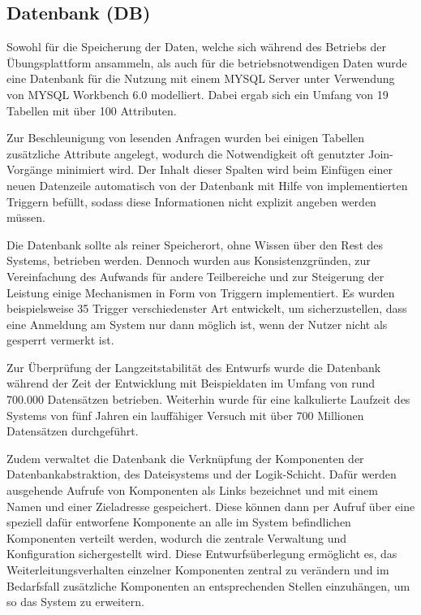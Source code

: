 \documentclass[10pt,a4paper,final,parskip]{scrartcl}
\begin{document}
 

\subsection{Datenbank (DB)}
\parbox{\textwidth}{Sowohl für die Speicherung der Daten, welche sich während des Betriebs der Übungsplattform ansammeln, als auch für die betriebsnotwendigen Daten wurde eine Datenbank für die Nutzung mit einem MYSQL Server unter Verwendung von MYSQL Workbench 6.0 modelliert. Dabei ergab sich ein Umfang von 19 Tabellen mit über 100 Attributen. }

\parbox{\textwidth}{Zur Beschleunigung von lesenden Anfragen wurden bei einigen Tabellen zusätzliche Attribute angelegt, wodurch die Notwendigkeit oft genutzter Join-Vorgänge minimiert wird. Der Inhalt dieser Spalten wird beim Einfügen einer neuen Datenzeile automatisch von der Datenbank mit Hilfe von implementierten Triggern befüllt, sodass diese Informationen nicht explizit angeben werden müssen.} 

\parbox{\textwidth}{Die Datenbank sollte als reiner Speicherort, ohne Wissen über den Rest des Systems, betrieben werden. Dennoch wurden aus Konsistenzgründen, zur Vereinfachung des Aufwands für andere Teilbereiche und zur Steigerung der Leistung einige Mechanismen in Form von Triggern implementiert.
Es wurden beispielsweise 35 Trigger verschiedenster Art entwickelt, um sicherzustellen, dass eine Anmeldung am System nur dann möglich ist, wenn der Nutzer nicht als gesperrt vermerkt ist.}
 
\parbox{\textwidth}{Zur Überprüfung der Langzeitstabilität des Entwurfs wurde die Datenbank während der Zeit der Entwicklung mit Beispieldaten im Umfang von rund 700.000 Datensätzen betrieben. Weiterhin wurde für eine kalkulierte Laufzeit des Systems von fünf Jahren ein lauffähiger Versuch mit über 700 Millionen Datensätzen durchgeführt.}

\parbox{\textwidth}{Zudem verwaltet die Datenbank die Verknüpfung der Komponenten der Daten\-bank\-abstraktion, des Dateisystems und der Logik-Schicht. Dafür werden ausgehende Aufrufe von Komponenten als Links bezeichnet und mit einem Namen und einer Ziel\-adresse gespeichert. Diese können dann per Aufruf über eine speziell dafür entworfene Komponente an alle im System befindlichen Komponenten verteilt werden, wodurch die zentrale Verwaltung und Konfiguration sichergestellt wird. Diese Entwurfsüberlegung ermöglicht es, das Weiterleitungsverhalten einzelner Komponenten zentral zu verändern und im Bedarfsfall zusätzliche Komponenten an entsprechenden Stellen einzuhängen, um so das System zu erweitern.}
\end{document}
